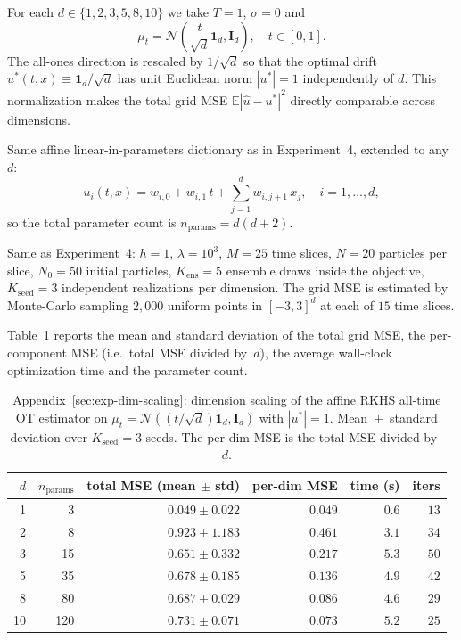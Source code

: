 \documentclass[11pt,leqno]{article}
\theoremstyle{plain}
\theoremstyle{remark}
\theoremstyle{definition}
\numberwithin{equation}{section}
\numberwithin{figure}{section}
\numberwithin{table}{section}
\begin{document}
For each $d\in\{1,2,3,5,8,10\}$ we take $T=1$, $\sigma=0$ and
\[
  \mu_t = \mathcal{N}\left(\frac{t}{\sqrt{d}}\mathbf{1}_d, \mathbf{I}_{d}\right),
  \quad t\in[0,1].
\]
The all-ones direction is rescaled by $1/\sqrt{d}$ so that the optimal
drift $u^{*}(t,x)\equiv\mathbf{1}_d/\sqrt{d}$ has unit Euclidean norm
$|u^{*}|=1$ independently of $d$.  This normalization makes the
total grid MSE $\mathbb{E}|\hat u-u^{\!*}|^{2}$ directly comparable
across dimensions.


Same affine linear-in-parameters dictionary as in Experiment~4,
extended to any~$d$:
\[
  u_i(t, x) = w_{i,0} + w_{i,1}\,t + \sum_{j=1}^{d} w_{i,j+1}\,x_j,
  \quad i = 1, \ldots, d,
\]
so the total parameter count is $n_{\mathrm{params}} = d(d+2)$.


Same as Experiment~4: $h=1$, $\lambda=10^{3}$, $M=25$ time slices,
$N=20$ particles per slice, $N_{0}=50$ initial particles,
$K_{\mathrm{ens}}=5$ ensemble draws inside the objective,
$K_{\mathrm{seed}}=3$ independent realizations per dimension.
The grid MSE is estimated by Monte-Carlo sampling $2{,}000$ uniform
points in $[-3,3]^{d}$ at each of $15$ time slices.


Table~\ref{tab:exp8} reports the mean and standard deviation of the
total grid MSE, the per-component MSE (i.e.\ total MSE divided
by~$d$), the average wall-clock optimization time and the parameter
count.

\begin{table}[ht]
\centering
\small
\begin{tabular}{rrrrrr}
\toprule
 $d$ & $n_{\mathrm{params}}$ & total MSE (mean $\pm$ std)
     & per-dim MSE & time (s) & iters \\
\midrule
  1 &    3 & $0.049 \pm 0.022$ & $0.049$ & $0.6$ & $13$ \\
  2 &    8 & $0.923 \pm 1.183$ & $0.461$ & $3.1$ & $34$ \\
  3 &   15 & $0.651 \pm 0.332$ & $0.217$ & $5.3$ & $50$ \\
  5 &   35 & $0.678 \pm 0.185$ & $0.136$ & $4.9$ & $42$ \\
  8 &   80 & $0.687 \pm 0.029$ & $0.086$ & $4.6$ & $29$ \\
 10 &  120 & $0.731 \pm 0.071$ & $0.073$ & $5.2$ & $25$ \\
\bottomrule
\end{tabular}
\caption{Appendix~\ref{sec:exp-dim-scaling}: dimension scaling of the affine RKHS all-time
OT estimator on $\mu_t=\mathcal{N}((t/\sqrt{d})\mathbf{1}_d, \mathbf{I}_d)$
with $|u^{*}|=1$.  Mean~$\pm$~standard deviation over
$K_{\mathrm{seed}}=3$ seeds.  The per-dim MSE is the total MSE divided
by~$d$.}
\label{tab:exp8}
\end{table}
\end{document}
